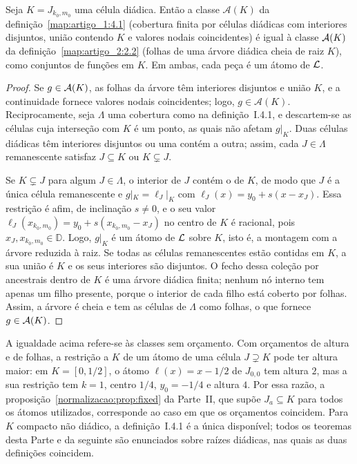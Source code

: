 \begin{proposicaoSN}\label{artigo_2:prop:bridge-part1}
Seja $K=J_{k_0,m_0}$ uma célula diádica. Então a classe $\mathcal A(K)$ da definição~\ref{map:artigo_1:4.1} (cobertura finita por células diádicas com interiores disjuntos, união contendo $K$ e valores nodais coincidentes) é igual à classe $\mathcal{A}(K)$ da definição~\ref{map:artigo_2:2.2} (folhas de uma árvore diádica cheia de raiz $K$), como conjuntos de funções em $K$. Em ambas, cada peça é um átomo de $\mathcal{L}$.
\end{proposicaoSN}
\begin{proof}
Se $g\in\mathcal{A}(K)$, as folhas da árvore têm interiores disjuntos e união $K$, e a continuidade fornece valores nodais coincidentes; logo, $g\in\mathcal A(K)$. Reciprocamente, seja $\Lambda$ uma cobertura como na definição~I.4.1, e descartem-se as células cuja interseção com $K$ é um ponto, as quais não afetam $g|_K$. Duas células diádicas têm interiores disjuntos ou uma contém a outra; assim, cada $J\in\Lambda$ remanescente satisfaz $J\subseteq K$ ou $K\subsetneq J$.

Se $K\subsetneq J$ para algum $J\in\Lambda$, o interior de $J$ contém o de $K$, de modo que $J$ é a única célula remanescente e $g|_K=\ell_J|_K$ com $\ell_J(x)=y_0+s(x-x_J)$. Essa restrição é afim, de inclinação $s\ne0$, e o seu valor $\ell_J(x_{k_0,m_0})=y_0+s(x_{k_0,m_0}-x_J)$ no centro de $K$ é racional, pois $x_J,x_{k_0,m_0}\in\mathbb D$. Logo, $g|_K$ é um átomo de $\mathcal{L}$ sobre $K$, isto é, a montagem com a árvore reduzida à raiz. Se todas as células remanescentes estão contidas em $K$, a sua união é $K$ e os seus interiores são disjuntos. O fecho dessa coleção por ancestrais dentro de $K$ é uma árvore diádica finita; nenhum nó interno tem apenas um filho presente, porque o interior de cada filho está coberto por folhas. Assim, a árvore é cheia e tem as células de $\Lambda$ como folhas, o que fornece $g\in\mathcal{A}(K)$.
\end{proof}
\begin{observacaoSN}
A igualdade acima refere-se às classes sem orçamento. Com orçamentos de altura e de folhas, a restrição a $K$ de um átomo de uma célula $J\supsetneq K$ pode ter altura maior: em $K=[0,1/2]$, o átomo $\ell(x)=x-1/2$ de $J_{0,0}$ tem altura $2$, mas a sua restrição tem $k=1$, centro $1/4$, $y_0=-1/4$ e altura $4$. Por essa razão, a proposição~\ref{normalizacao:prop:fixed} da Parte~II, que supõe $J_a\subseteq K$ para todos os átomos utilizados, corresponde ao caso em que os orçamentos coincidem. Para $K$ compacto não diádico, a definição~I.4.1 é a única disponível; todos os teoremas desta Parte e da seguinte são enunciados sobre raízes diádicas, nas quais as duas definições coincidem.
\end{observacaoSN}

